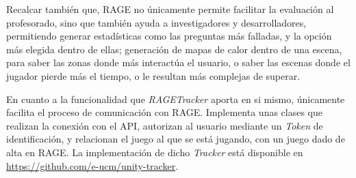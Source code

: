 Recalcar también que, RAGE no únicamente permite facilitar la evaluación al profesorado, sino que también ayuda a investigadores y desarrolladores, permitiendo generar estadísticas como las preguntas más falladas, y la opción más elegida dentro de ellas; generación de mapas de calor dentro de una escena, para saber las zonas donde más interactúa el usuario, o saber las escenas donde el jugador pierde más el tiempo, o le resultan más complejas de superar.

En cuanto a la funcionalidad que \textit{RAGETracker} aporta en si mismo, únicamente facilita el proceso de comunicación con RAGE. Implementa unas clases que realizan la conexión con el API, autorizan al usuario mediante un \textit{Token} de identificación, y relacionan el juego al que se está jugando, con un juego dado de alta en RAGE. La implementación de dicho \textit{Tracker} está disponible en \url{https://github.com/e-ucm/unity-tracker}.